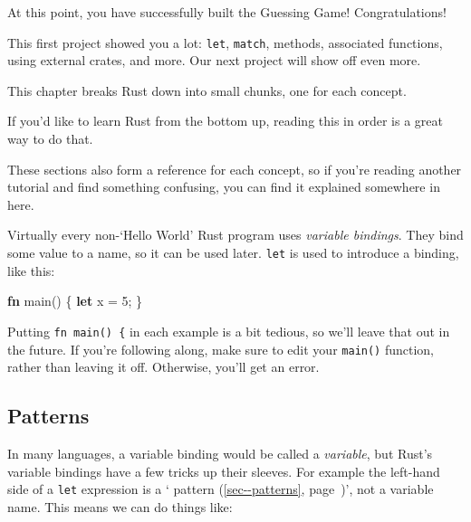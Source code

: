 \documentclass[a4paper,]{book}
\renewcommand*{\hyperref}[2][\ar]{%
  \def\ar{#2}%
  #2 (\autoref{#1}, page~\pageref{#1})}
\newenvironment{Shaded}{\begin{snugshade}}{\end{snugshade}}
\newcommand{\KeywordTok}[1]{\textcolor[rgb]{0.13,0.29,0.53}{\textbf{{#1}}}}
\newcommand{\DecValTok}[1]{\textcolor[rgb]{0.00,0.00,0.81}{{#1}}}
\newcommand{\NormalTok}[1]{{#1}}
\begin{document}
At this point, you have successfully built the Guessing Game!
Congratulations!

This first project showed you a lot: \texttt{let}, \texttt{match},
methods, associated functions, using external crates, and more. Our next
project will show off even more.


This chapter breaks Rust down into small chunks, one for each concept.

If you'd like to learn Rust from the bottom up, reading this in order is
a great way to do that.

These sections also form a reference for each concept, so if you're
reading another tutorial and find something confusing, you can find it
explained somewhere in here.


Virtually every non-`Hello World' Rust program uses \emph{variable
bindings}. They bind some value to a name, so it can be used later.
\texttt{let} is used to introduce a binding, like this:

\begin{Shaded}
\begin{Highlighting}[]
\KeywordTok{fn} \NormalTok{main() \{}
    \KeywordTok{let} \NormalTok{x = }\DecValTok{5}\NormalTok{;}
\NormalTok{\}}
\end{Highlighting}
\end{Shaded}

Putting \texttt{fn\ main()\ \{} in each example is a bit tedious, so
we'll leave that out in the future. If you're following along, make sure
to edit your \texttt{main()} function, rather than leaving it off.
Otherwise, you'll get an error.

\subsection{Patterns}\label{patterns}

In many languages, a variable binding would be called a \emph{variable},
but Rust's variable bindings have a few tricks up their sleeves. For
example the left-hand side of a \texttt{let} expression is a
`\hyperref[sec--patterns]{pattern}', not a variable name. This means we
can do things like:
\end{document}
